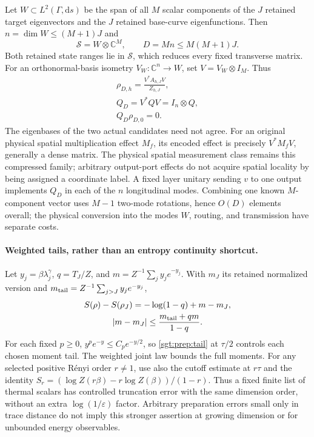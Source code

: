 \documentclass[aps,pra,reprint,superscriptaddress,longbibliography]{revtex4-2}
\newcommand{\dd}{\mathrm d}
\begin{document}
Let $W\subset L^2(\Gamma,\dd s)$ be the span of all $M$ scalar
components of the $J$ retained target eigenvectors and the $J$ retained
base-curve eigenfunctions. Then $n=\dim W\le(M+1)J$ and
\begin{equation}
 \mathcal S=W\otimes\mathbb C^M,\qquad
 D=Mn\le M(M+1)J.
 \label{sgt:prep:dimension}
\end{equation}
Both retained state ranges lie in $\mathcal S$, which reduces every
fixed transverse matrix. For an orthonormal-basis isometry
$V_W:\mathbb C^n\to W$, set $V=V_W\otimes I_M$. Thus
\begin{equation}
\begin{gathered}
 \rho_{D,h}=\frac{V^*A_{h,J}V}{Z_{h,J}},\\
 Q_D=V^*QV=I_n\otimes Q,\\
 Q_D\rho_{D,0}=0.
 \label{sgt:prep:common-Q}
\end{gathered}
\end{equation}
The eigenbases of the two actual candidates need not agree.
For an original physical spatial multiplication effect $M_f$, its
encoded effect is precisely $V^*M_fV$, generally a dense matrix.
The physical spatial measurement class remains this compressed family;
arbitrary output-port effects do not acquire spatial locality by
being assigned a coordinate label. A fixed layer unitary sending $v$
to one output implements $Q_D$ in each of the $n$ longitudinal modes.
Combining one known $M$-component vector uses $M-1$ two-mode rotations,
hence $O(D)$ elements overall; the physical conversion into the modes
$W$, routing, and transmission have separate costs.

\paragraph{Weighted tails, rather than an entropy continuity shortcut.}
Let $y_j=\beta\lambda_j^\gamma$, $q=T_J/Z$, and
$m=Z^{-1}\sum_j y_je^{-y_j}$. With $m_J$ its retained normalized
version and $m_{\rm tail}=Z^{-1}\sum_{j>J}y_je^{-y_j}$,
\[
\begin{gathered}
 S(\rho)-S(\rho_J)=-\log(1-q)+m-m_J,
 \\
 |m-m_J|\le\frac{m_{\rm tail}+qm}{1-q}.
\end{gathered}
\]
For each fixed $p\ge0$, $y^pe^{-y}\le C_pe^{-y/2}$, so
\eqref{sgt:prep:tail} at $\tau/2$ controls each chosen moment tail.
The weighted joint law bounds the full moments. For any selected
positive R\'enyi order $r\ne1$, use also the cutoff estimate at
$r\tau$ and the identity
$S_r=(\log Z(r\beta)-r\log Z(\beta))/(1-r)$.
Thus a fixed finite list of thermal scalars has controlled truncation
error with the same dimension order, without an extra
$\log(1/\varepsilon)$ factor. Arbitrary preparation errors small only
in trace distance do not imply this stronger assertion at growing
dimension or for unbounded energy observables.
\end{document}

